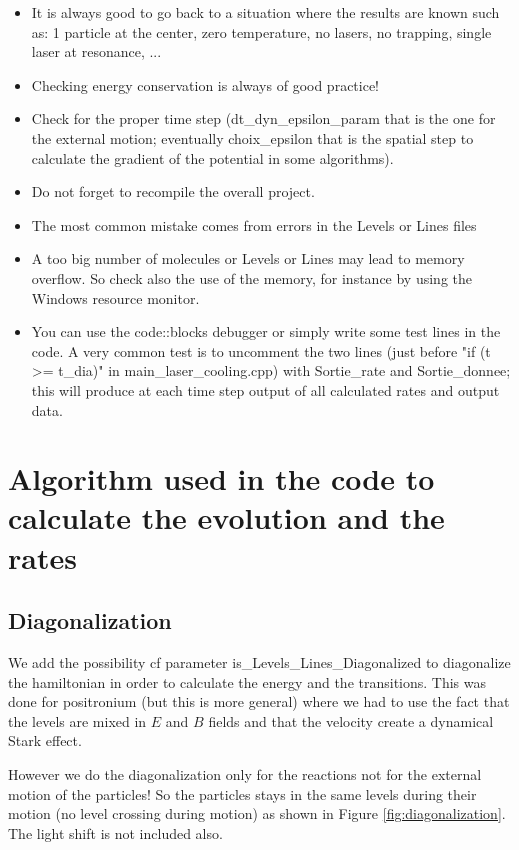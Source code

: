 \documentclass[amsmath,amssymb,nofootinbib]{revtex4-2}
\begin{document}
\begin{itemize}
	\item It is always good to go back to a situation where the results are known such as: 1 particle at the center, zero temperature, no lasers, no trapping, single laser at resonance, ...
\item Checking energy conservation is always of good practice!
\item Check for the proper time step (dt\_dyn\_epsilon\_param that is the one for the external motion; eventually choix\_epsilon that is the spatial step to calculate the gradient of the potential in some algorithms).
	\item Do not forget to recompile the overall project.
	\item The most common mistake comes from errors in the Levels or Lines files
	\item A too big number of molecules or Levels or Lines may lead to memory overflow. So check also the use of the memory, for instance by using the Windows resource monitor.
	\item You can use the code::blocks debugger or simply write some test lines in the code. A very common test is to uncomment the two lines (just before "if (t >= t\_dia)" in main\_laser\_cooling.cpp) with Sortie\_rate and Sortie\_donnee; this will produce at each time step output of all calculated rates and output data.
	
\end{itemize}





\section{Algorithm used in the code to calculate the evolution and the rates}
\label{section_algorithm}

\subsection{Diagonalization}
\label{diagonalization}

We add the possibility cf parameter is\_Levels\_Lines\_Diagonalized
to diagonalize the hamiltonian in order to calculate the energy and the transitions. This was done for positronium (but this is more general) where we had to use the fact that the levels are mixed in $E$ and $B$ fields and that the velocity create a dynamical Stark effect.  

However we do the diagonalization only for the reactions not for the external motion of the particles! So the particles stays in the same levels during their motion (no level crossing during motion) as shown in Figure \ref{fig:diagonalization}. The light shift is not included also.
\end{document}

